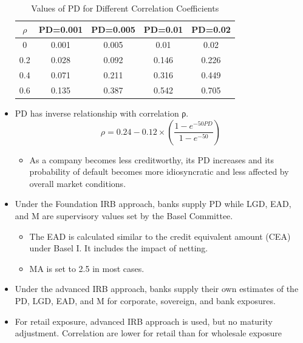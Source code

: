 \begin{itemize}
\begin{table}[h]
    \centering
    \caption{Values of PD for Different Correlation Coefficients}
    \renewcommand{\arraystretch}{1.5} %
    \begin{tabular}{|c|c|c|c|c|}
        \hline
        \textbf{$\rho$} & \textbf{PD=0.001} & \textbf{PD=0.005} & \textbf{PD=0.01} & \textbf{PD=0.02} \\
        \hline
        0 & 0.001 & 0.005 & 0.01 & 0.02 \\
        \hline
        0.2 & 0.028 & 0.092 & 0.146 & 0.226 \\
        \hline
        0.4 & 0.071 & 0.211 & 0.316 & 0.449 \\
        \hline
        0.6 & 0.135 & 0.387 & 0.542 & 0.705 \\
        \hline
    \end{tabular}
\end{table}

\item PD has inverse relationship with correlation ρ.
    \begin{equation}
    \rho = 0.24 - 0.12 \times \left( \frac{1 - e^{-50PD}}{1 - e^{-50}} \right)
    \end{equation}
    \begin{itemize}
    \item As a company becomes less creditworthy, its PD increases and its probability of default becomes more idiosyncratic and less affected by overall market conditions.
    \end{itemize}
\item Under the Foundation IRB approach, banks supply PD while LGD, EAD, and M are supervisory values set by the Basel Committee.
    \begin{itemize}
    \item The EAD is calculated similar to the credit equivalent amount (CEA) under Basel I. It includes the impact of netting.
    \item MA is set to 2.5 in most cases.
    \end{itemize}
\item Under the advanced IRB approach, banks supply their own estimates of the PD, LGD, EAD, and M for corporate, sovereign, and bank exposures.
\item For retail exposure, advanced IRB approach is used, but no maturity adjustment. Correlation are lower for retail than for wholesale exposure
\end{itemize}


